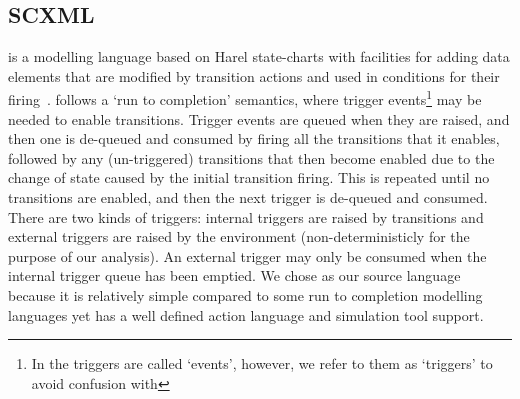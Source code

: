 
\subsection{SCXML}
\label{sec:scxml}

\SCXML is a modelling language based on Harel state-charts with facilities for adding data elements that are modified by transition actions and used in conditions for their firing~\cite{scxmlwebsite}. \SCXML follows a `run to completion' semantics, where trigger events\footnote{In \SCXML the triggers are called `events', however, we refer to them as `triggers' to avoid confusion with \EventB} may be needed to enable transitions. Trigger events are queued when they are raised, and then one is de-queued and consumed by firing all the transitions that it enables, followed by any (un-triggered) transitions that then become enabled due to the change of state caused by the initial transition firing. This is repeated until no transitions are enabled, and then the next trigger is de-queued and consumed. There are two kinds of triggers: internal triggers are raised by transitions and external triggers are raised by the environment (non-deterministicly for the purpose of our analysis). An external trigger may only be consumed when the internal trigger queue has been emptied. 
We chose \SCXML as our source language because it is relatively simple compared to some run to completion modelling languages yet has a well defined action language and simulation tool support.



